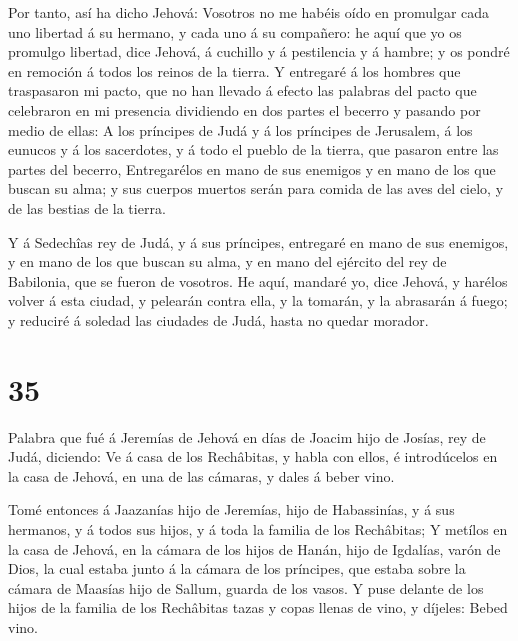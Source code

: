  Por tanto, así ha dicho Jehová: Vosotros no me habéis oído
en promulgar cada uno libertad á su hermano, y cada uno á su compañero:
he aquí que yo os promulgo libertad, dice Jehová, á cuchillo y á
pestilencia y á hambre; y os pondré en remoción á todos los reinos de la
tierra.  Y entregaré á los hombres que traspasaron mi
pacto, que no han llevado á efecto las palabras del pacto que celebraron
en mi presencia dividiendo en dos partes el becerro y pasando por medio
de ellas:  A los príncipes de Judá y á los príncipes de
Jerusalem, á los eunucos y á los sacerdotes, y á todo el pueblo de la
tierra, que pasaron entre las partes del becerro, 
Entregarélos en mano de sus enemigos y en mano de los que buscan su
alma; y sus cuerpos muertos serán para comida de las aves del cielo, y
de las bestias de la tierra.

 Y á Sedechîas rey de Judá, y á sus príncipes, entregaré en
mano de sus enemigos, y en mano de los que buscan su alma, y en mano del
ejército del rey de Babilonia, que se fueron de vosotros. 
He aquí, mandaré yo, dice Jehová, y harélos volver á esta ciudad, y
pelearán contra ella, y la tomarán, y la abrasarán á fuego; y reduciré á
soledad las ciudades de Judá, hasta no quedar morador.

\hypertarget{section-34}{%
\section{35}\label{section-34}}

 Palabra que fué á Jeremías de Jehová en días de Joacim hijo
de Josías, rey de Judá, diciendo:  Ve á casa de los
Rechâbitas, y habla con ellos, é introdúcelos en la casa de Jehová, en
una de las cámaras, y dales á beber vino.

 Tomé entonces á Jaazanías hijo de Jeremías, hijo de
Habassinías, y á sus hermanos, y á todos sus hijos, y á toda la familia
de los Rechâbitas;  Y metílos en la casa de Jehová, en la
cámara de los hijos de Hanán, hijo de Igdalías, varón de Dios, la cual
estaba junto á la cámara de los príncipes, que estaba sobre la cámara de
Maasías hijo de Sallum, guarda de los vasos.  Y puse delante
de los hijos de la familia de los Rechâbitas tazas y copas llenas de
vino, y díjeles: Bebed vino.

